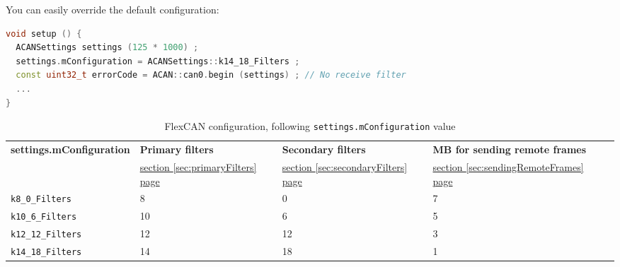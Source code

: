 \documentclass[9pt, a4paper, obeyspaces, openany]{extarticle}
\newcommand\refSectionPage[1]{\hyperref[sec:#1]{section \ref*{sec:#1} page \pageref{sec:#1}}}
\newcommand\labelTableau[1]{\label{tab:#1}}
\begin{document}
You can easily override the default configuration:
{ \small\begin{lstlisting}[language=c++]
void setup () {
  ACANSettings settings (125 * 1000) ;
  settings.mConfiguration = ACANSettings::k14_18_Filters ;
  const uint32_t errorCode = ACAN::can0.begin (settings) ; // No receive filter
  ...
}
\end{lstlisting}}


\begin{table}[htbp]
  \small
  \onehalfspacing
  \centering
  \begin{tabular}{lllll}
    \textbf{settings.mConfiguration}& \textbf{Primary filters} & \textbf{Secondary filters} & \textbf{MB for sending remote frames} \\
                                   & \refSectionPage{primaryFilters} & \refSectionPage{secondaryFilters} & \refSectionPage{sendingRemoteFrames} \\
    \texttt{k8\_0\_Filters} & 8 & 0 & 7\\
    \texttt{k10\_6\_Filters} & 10 & 6 & 5\\
    \texttt{k12\_12\_Filters} & 12 & 12 & 3\\
    \texttt{k14\_18\_Filters} & 14 & 18 & 1\\
  \end{tabular}
  \caption{FlexCAN configuration, following \texttt{settings.mConfiguration} value}
  \labelTableau{configFlexCAN}
\end{table}










%
%
%
%
\end{document}
